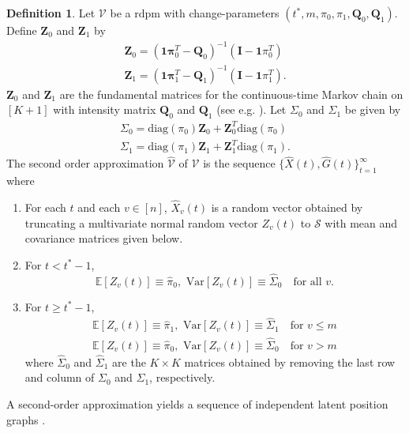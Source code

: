 \documentclass[10pt,draftclsnofoot,onecolumn]{IEEEtran}
\theoremstyle{definition}
\newtheorem{definition}{Definition}
\begin{document}
 \begin{definition}
  \label{def:2}
  Let $\mathscr{V}$ be a rdpm with change-parameters $(t^{*}, m,
  \pi_0, \pi_1, \mathbf{Q}_0, \mathbf{Q}_1)$. Define
  $\mathbf{Z}_0$ and $\mathbf{Z}_1$ by
  \begin{gather}
    \mathbf{Z}_0 = (\mathbf{1}\mathbf{\pi}_0^{T} -
     \mathbf{Q}_0)^{-1}(\mathbf{I} - \mathbf{1}\pi_0^{T}) \\
    \mathbf{Z}_1 = (\mathbf{1}\mathbf{\pi}_1^{T} -
     \mathbf{Q}_1)^{-1}(\mathbf{I} - \mathbf{1}\pi_1^{T}).
  \end{gather}
  $\mathbf{Z}_0$ and $\mathbf{Z}_1$ are the fundamental matrices
  for the continuous-time Markov chain on $[K+1]$ with intensity
  matrix $\mathbf{Q}_0$ and $\mathbf{Q}_1$ (see
  e.g. \cite[p. 55]{asmussen03:_applied_probab_queues}). Let
  $\Sigma_0$ and $\Sigma_1$ be given by
  \begin{gather*}
    \Sigma_0 = \mathrm{diag}(\pi_0) \mathbf{Z}_0 +
    \mathbf{Z}_0^{T}
    \mathrm{diag}(\pi_0) \\
    \Sigma_1 = \mathrm{diag}(\pi_1) \mathbf{Z}_1 +
    \mathbf{Z}_1^{T}
    \mathrm{diag}(\pi_1).
  \end{gather*}
  The second order approximation $\widehat{\mathscr{V}}$ of
  $\mathscr{V}$ is the sequence $\{\widehat{X}(t),
  \widehat{G}(t)\}_{t=1}^{\infty}$ where
  \begin{enumerate}
  \item For each $t$ and each $v \in [n]$, $\widehat{X}_v(t)$ is a
    random vector obtained by truncating a multivariate normal random
    vector $Z_{v}(t)$ to $\mathscr{S}$ with mean and covariance
    matrices given below.
  \item For $t < t^{*} - 1$,
    \begin{equation}
      \mathbb{E}[Z_v(t)] \equiv \hat{\pi}_0, \,\, 
  \mathrm{Var}[Z_v(t)] \equiv \widehat{\Sigma}_0 \quad \text{for all
    $v$}.
    \end{equation}
  \item For $t \geq t^{*} - 1$,  
    \begin{gather*}
      \mathbb{E}[Z_v(t)] \equiv \hat{\pi}_1, \,\, 
\mathrm{Var}[Z_v(t)] \equiv \widehat{\Sigma}_{1} \quad \text{for $v
  \leq m$} \\
  \mathbb{E}[Z_v(t)] \equiv \hat{\pi}_0, \,\, \mathrm{Var}[Z_v(t)] \equiv \widehat{\Sigma}_{0} \quad \text{for $v
        > m$}
    \end{gather*}
    where $\widehat{\Sigma}_0$ and $\widehat{\Sigma}_1$ are the $K
    \times K$ matrices
    obtained by removing the last row and column of $\Sigma_0$ and
    $\Sigma_1$, respectively. 
  \end{enumerate}
\end{definition}
A second-order approximation yields a sequence of independent latent
position graphs
\cite{marchette08:_predic,scheinerman10:_model,hoff02:_laten}.  
\end{document}
